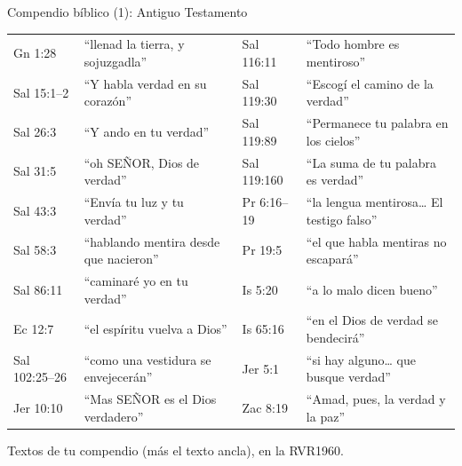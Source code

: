 \documentclass[hyperref={bookmarks=false},aspectratio=169]{beamer}
\newcommand{\SENOR}{S{\fontsize{0.78em}{1em}\selectfont EÑOR}}
\begin{document}
\begin{frame}{Compendio bíblico (1): Antiguo Testamento}
\fontsize{6.2}{7.4}\selectfont\renewcommand{\arraystretch}{1.08}
\begin{tabular}{@{}>{\RaggedRight\arraybackslash}p{1.6cm}>{\RaggedRight\arraybackslash}p{4.3cm}|>{\RaggedRight\arraybackslash}p{1.6cm}>{\RaggedRight\arraybackslash}p{4.3cm}@{}}
\toprule
Gn 1:28 & ``llenad la tierra, y sojuzgadla'' & Sal 116:11 & ``Todo hombre es mentiroso'' \\
Sal 15:1--2 & ``Y habla verdad en su corazón'' & Sal 119:30 & ``Escogí el camino de la verdad'' \\
Sal 26:3 & ``Y ando en tu verdad'' & Sal 119:89 & ``Permanece tu palabra en los cielos'' \\
Sal 31:5 & ``oh \SENOR{}, Dios de verdad'' & Sal 119:160 & ``La suma de tu palabra es verdad'' \\
Sal 43:3 & ``Envía tu luz y tu verdad'' & Pr 6:16--19 & ``la lengua mentirosa\ldots{} El testigo falso'' \\
Sal 58:3 & ``hablando mentira desde que nacieron'' & Pr 19:5 & ``el que habla mentiras no escapará'' \\
Sal 86:11 & ``caminaré yo en tu verdad'' & Is 5:20 & ``a lo malo dicen bueno'' \\
Ec 12:7 & ``el espíritu vuelva a Dios'' & Is 65:16 & ``en el Dios de verdad se bendecirá'' \\
Sal 102:25--26 & ``como una vestidura se envejecerán'' & Jer 5:1 & ``si hay alguno\ldots{} que busque verdad'' \\
Jer 10:10 & ``Mas \SENOR{} es el Dios verdadero'' & Zac 8:19 & ``Amad, pues, la verdad y la paz'' \\
\bottomrule
\end{tabular}\par\smallskip
{\tiny\color{gris}Textos de tu compendio (más el texto ancla), en la RVR1960.}
\end{frame}
\end{document}
